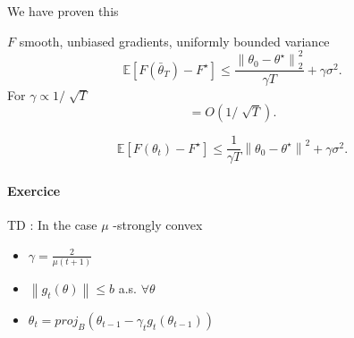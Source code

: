 We have proven this 
\begin{thm}[]
    $F$ smooth, unbiased gradients, uniformly bounded variance    
    \[
        \mathbb{E}[F(\bar{\theta }_T) - F^\star ] \leq \frac{\left\| \theta _0 - \theta ^\star  \right\| _2 ^2 }{\gamma T} + \gamma \sigma ^2 
    .\]
    For $ \gamma \propto 1 / \sqrt[]{T} $ 
    \[
        = O (1 / \sqrt[]{T})
    .\]
\end{thm}

\[
    \mathbb{E}[F({\theta }_t) - F^{\star} ] \leq \frac{1}{\gamma T} \left\| \theta _0 - \theta^{\star } \right\|^2 + \gamma  \sigma ^2 
.\]


\paragraph*{Exercice}
TD : In the case $ \mu  $ -strongly convex \begin{itemize}
    \item $ \gamma = \frac{2}{\mu (t+1)} $
    \item $ \left\| g_t (\theta ) \right\| \leq b $  a.s. $ \forall \theta  $ 
    \item $ \theta _t = proj_B (\theta _{t-1} - \gamma _t g_t (\theta _{t-1})) $ 
\end{itemize}


